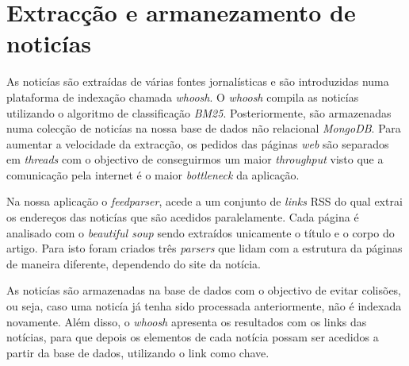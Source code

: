 \section{Extracção e armanezamento de noticías}
As noticías são extraídas de várias fontes jornalísticas e são introduzidas numa plataforma de indexação chamada \textit{whoosh}. O \textit{whoosh} compila as noticías utilizando o algoritmo de classificação \textit{BM25}. Posteriormente, são armazenadas numa colecção de noticías na nossa base de dados não relacional \textit{MongoDB}. Para aumentar a velocidade da extracção, os pedidos das páginas \textit{web} são separados em \textit{threads} com o objectivo de conseguirmos um maior \textit{throughput} visto que a comunicação pela internet é o maior \textit{bottleneck} da aplicação.

Na nossa aplicação o \textit{feedparser}, acede a um conjunto de \textit{links} RSS do qual extrai os endereços das noticías que são acedidos paralelamente. Cada página é analisado com o \textit{beautiful soup} sendo extraídos unicamente o título e o corpo do artigo. Para isto foram criados três \textit{parsers} que lidam com a estrutura da páginas de maneira diferente, dependendo do site da notícia.

As noticías são armazenadas na base de dados com o objectivo de evitar colisões, ou seja, caso uma noticía já tenha sido processada anteriormente, não é indexada novamente. Além disso, o \textit{whoosh} apresenta os resultados com os links das notícias, para que depois os elementos de cada notícia possam ser acedidos a partir da base de dados, utilizando o link como chave.

